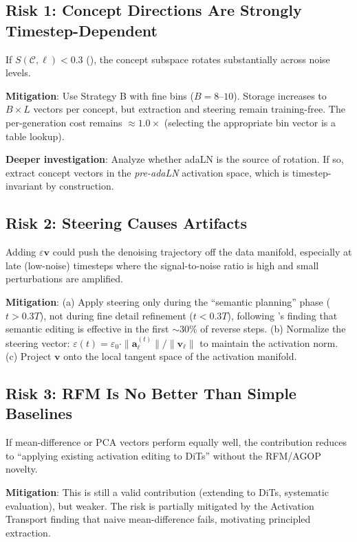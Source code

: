 \documentclass[11pt]{article}
\newcommand{\ba}{\mathbf{a}}
\newcommand{\bv}{\mathbf{v}}
\begin{document}
\subsection{Risk 1: Concept Directions Are Strongly Timestep-Dependent}

If $S(\mathcal{C}, \ell) < 0.3$ (), the concept subspace rotates substantially across noise levels.

\textbf{Mitigation}: Use Strategy B with fine bins ($B = 8$--$10$).
Storage increases to $B \times L$ vectors per concept, but extraction and steering remain training-free.
The per-generation cost remains $\approx 1.0\times$ (selecting the appropriate bin vector is a table lookup).

\textbf{Deeper investigation}: Analyze whether adaLN is the source of rotation.
If so, extract concept vectors in the \emph{pre-adaLN} activation space, which is timestep-invariant by construction.

\subsection{Risk 2: Steering Causes Artifacts}

Adding $\varepsilon\bv$ could push the denoising trajectory off the data manifold, especially at late (low-noise) timesteps where the signal-to-noise ratio is high and small perturbations are amplified.

\textbf{Mitigation}: (a) Apply steering only during the ``semantic planning'' phase ($t > 0.3T$), not during fine detail refinement ($t < 0.3T$), following \citet{kwon2023diffusion}'s finding that semantic editing is effective in the first $\sim$30\% of reverse steps.
(b) Normalize the steering vector: $\varepsilon(t) = \varepsilon_0 \cdot \|\ba_\ell^{(t)}\| / \|\bv_\ell\|$ to maintain the activation norm.
(c) Project $\bv$ onto the local tangent space of the activation manifold.

\subsection{Risk 3: RFM Is No Better Than Simple Baselines}

If mean-difference or PCA vectors perform equally well, the contribution reduces to ``applying existing activation editing to DiTs'' without the RFM/AGOP novelty.

\textbf{Mitigation}: This is still a valid contribution (extending to DiTs, systematic evaluation), but weaker.
The risk is partially mitigated by the Activation Transport finding \citep{lyu2025activation} that naive mean-difference fails, motivating principled extraction.
\end{document}

